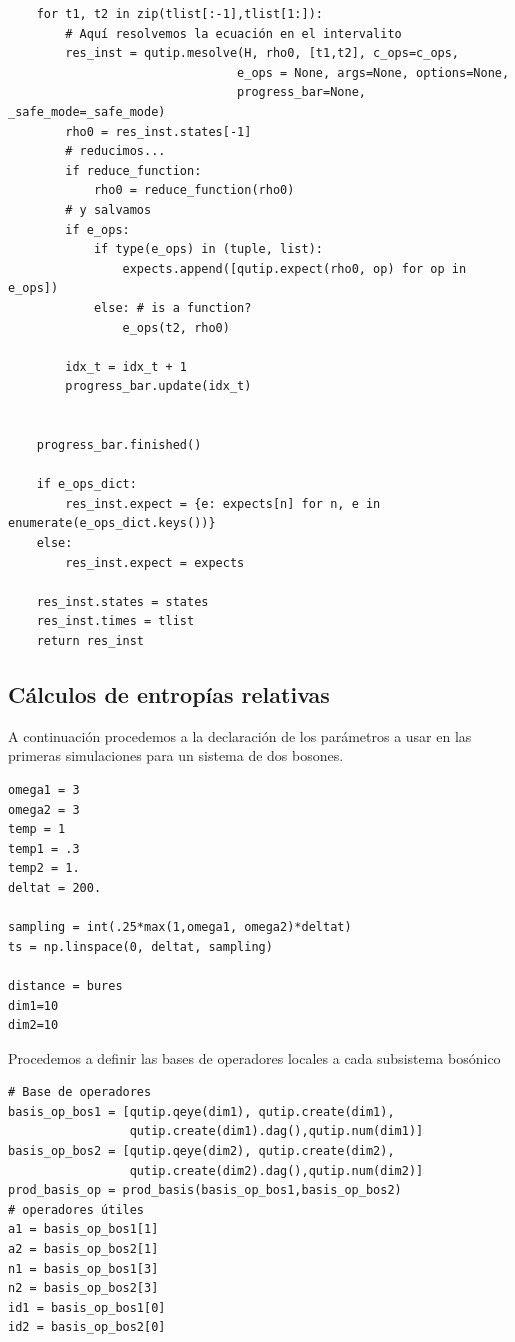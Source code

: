 \documentclass{report} %
\numberwithin{equation}{section}
\begin{document}
\begin{verbatim}
    for t1, t2 in zip(tlist[:-1],tlist[1:]):
        # Aquí resolvemos la ecuación en el intervalito
        res_inst = qutip.mesolve(H, rho0, [t1,t2], c_ops=c_ops,
                                e_ops = None, args=None, options=None,
                                progress_bar=None, _safe_mode=_safe_mode)
        rho0 = res_inst.states[-1]
        # reducimos...
        if reduce_function:
            rho0 = reduce_function(rho0)
        # y salvamos
        if e_ops:
            if type(e_ops) in (tuple, list):
                expects.append([qutip.expect(rho0, op) for op in e_ops])
            else: # is a function?
                e_ops(t2, rho0)
                
        idx_t = idx_t + 1
        progress_bar.update(idx_t)

            
    progress_bar.finished()

    if e_ops_dict:
        res_inst.expect = {e: expects[n] for n, e in enumerate(e_ops_dict.keys())}
    else:
        res_inst.expect = expects

    res_inst.states = states
    res_inst.times = tlist    
    return res_inst
\end{verbatim}

\subsection{Cálculos de entropías relativas}

A continuación procedemos a la declaración de los parámetros a usar en las primeras simulaciones para un sistema de dos bosones. 

\begin{verbatim}
omega1 = 3
omega2 = 3
temp = 1
temp1 = .3
temp2 = 1.
deltat = 200.

sampling = int(.25*max(1,omega1, omega2)*deltat)
ts = np.linspace(0, deltat, sampling)

distance = bures
dim1=10
dim2=10
\end{verbatim}

Procedemos a definir las bases de operadores locales a cada subsistema bosónico 

\begin{verbatim}
# Base de operadores
basis_op_bos1 = [qutip.qeye(dim1), qutip.create(dim1),
                 qutip.create(dim1).dag(),qutip.num(dim1)]
basis_op_bos2 = [qutip.qeye(dim2), qutip.create(dim2),
                 qutip.create(dim2).dag(),qutip.num(dim2)]
prod_basis_op = prod_basis(basis_op_bos1,basis_op_bos2)
# operadores útiles
a1 = basis_op_bos1[1]
a2 = basis_op_bos2[1]
n1 = basis_op_bos1[3]
n2 = basis_op_bos2[3]
id1 = basis_op_bos1[0]
id2 = basis_op_bos2[0]
\end{verbatim}
\end{document}
